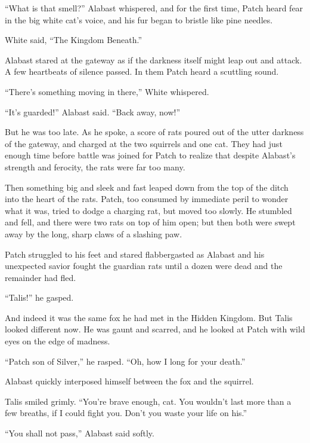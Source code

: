 \documentclass[ebook,oneside,openany,17pt]{memoir}
\begin{document}
“What is that smell?” Alabast whispered, and for the first time, Patch
heard fear in the big white cat’s voice, and his fur began to bristle
like pine needles.

White said, “The Kingdom Beneath.”

Alabast stared at the gateway as if the darkness itself might leap out
and attack. A few heartbeats of silence passed. In them Patch heard a
scuttling sound.

“There’s something moving in there,” White whispered.

“It’s guarded!” Alabast said. “Back away, now!”

But he was too late. As he spoke, a score of rats poured out of the
utter darkness of the gateway, and charged at the two squirrels and
one cat. They had just enough time before battle was joined for Patch
to realize that despite Alabast’s strength and ferocity, the rats were
far too many.

Then something big and sleek and fast leaped down from the top of the
ditch into the heart of the rats. Patch, too consumed by immediate
peril to wonder what it was, tried to dodge a charging rat, but moved
too slowly. He stumbled and fell, and there were two rats on top of
him open; but then both were swept away by the long, sharp claws of a
slashing paw.

Patch struggled to his feet and stared flabbergasted as Alabast and
his unexpected savior fought the guardian rats until a dozen were dead
and the remainder had fled.

“Talis!” he gasped.

And indeed it was the same fox he had met in the Hidden Kingdom. But
Talis looked different now. He was gaunt and scarred, and he looked at
Patch with wild eyes on the edge of madness.

“Patch son of Silver,” he rasped. “Oh, how I long for your death.”

Alabast quickly interposed himself between the fox and the squirrel.

Talis smiled grimly. “You’re brave enough, cat. You wouldn’t last more
than a few breaths, if I could fight you. Don’t you waste your life on
his.”

“You shall not pass,” Alabast said softly.
\end{document}
